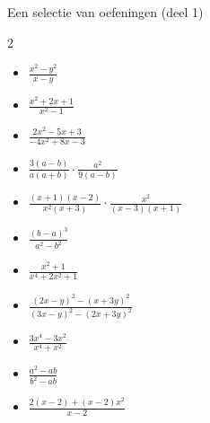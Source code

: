 \begin{lesactiviteit}{Een selectie van oefeningen (deel 1)}
\begin{multicols}{2}
\begin{vraagenantwoord}
    \begin{itemize}[label=\textcolor{\rubriekkleur}{\Large\textbullet}] 
    \item $\frac{x^2-y^2}{x-y}$
    \item $\frac{x^2+2x+1}{x^2-1}$
    \item $\frac{2x^2-5x+3}{-4x^2+8x-3}$
    \end{itemize}
    \begin{itemize}[label=\textcolor{\rubriekkleur}{\Large\textbullet}] 
    \item $\frac{3(a-b)}{a(a+b)} \cdot \frac{a^2}{9(a-b)}$
    \item $\frac{(x+1)(x-2)}{x^2(x+3)} \cdot \frac{x^2}{(x-3)(x+1)}$
    \end{itemize}
    \begin{itemize}[label=\textcolor{\rubriekkleur}{\Large\textbullet}] 
    \item $\frac{(b-a)^3}{a^2-b^2}$
    \item $\frac{x^2+1}{x^4+2x^2+1}$
    \item $\frac{(2x-y)^2-(x+3y)^2}{(3x-y)^2-(2x+3y)^2}$
    \end{itemize}
    \begin{itemize}[label=\textcolor{\rubriekkleur}{\Large\textbullet}] 
    \item $\frac{3x^4-3x^2}{x^4+x^2}$
    \item $\frac{a^2-ab}{b^2-ab}$
    \item $\frac{2(x-2)+(x-2)x^2}{x-2}$
    \end{itemize}
\end{vraagenantwoord}
 \end{multicols}   
\end{lesactiviteit}








